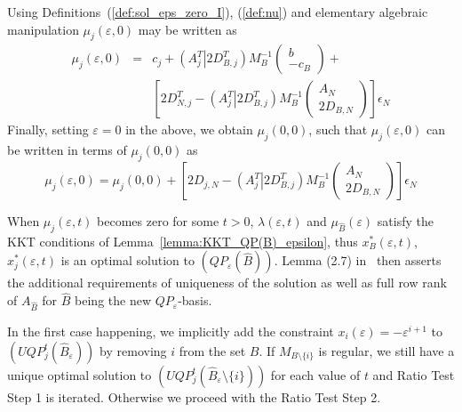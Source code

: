 \documentclass[a4paper]{article}
\newcommand{\xe}[1]{\ensuremath{x_{#1}(\varepsilon)}}
\begin{document}
Using Definitions~(\ref{def:sol_eps_zero_I}), (\ref{def:nu}) and elementary
algebraic manipulation
$\mu_{j}(\varepsilon,0)$ may be written as
\begin{eqnarray*}
  \mu_{j}\left(\varepsilon, 0\right) &=& c_{j} +
  \left(A_{j}^{T} \left|\right. 2D_{B, j}^{T} \right)
  M_{B}^{-1}
  \left(\begin{array}{c}
          b \\
	  \hline
	  -c_{B}
	\end{array}
  \right) + \\
  &&
  \left[2D_{N, j}^{T} -
    \left(A_{j}^{T} \left|\right. 2D_{B, j}^{T} \right)
    M_{B}^{-1}
    \left(\begin{array}{c}
            A_{N} \\
	    \hline
	    2D_{B,N}
	  \end{array}
    \right)
  \right]\epsilon_{N} 
\end{eqnarray*}
Finally, setting $\varepsilon=0$ in the above, we obtain $\mu_{j}(0, 0)$, such
that $\mu_{j}(\varepsilon, 0)$ can be written in terms of $\mu_{j}(0,0)$ as
\begin{equation}
\label{eq:mu_j_eps_zero}
\mu_{j}\left(\varepsilon, 0\right) =
  \mu_{j}\left(0,0\right) +
    \left[
    2D_{j, N} - \left(A_{j}^{T} \left| \right. 2D_{B, j}^{T} \right)
    M_{B}^{-1}
    \left(\begin{array}{c}
            A_{N} \\
	    \hline
	    2D_{B, N}
	  \end{array}
    \right)
  \right]\epsilon_{N}
\end{equation}

When $\mu_{j}\left(\varepsilon, t\right)$ becomes zero for some $t > 0$,
$\lambda\left(\varepsilon, t\right)$ and $\mu_{\hat{B}}(\varepsilon)$ satisfy
the KKT conditions of Lemma~\ref{lemma:KKT_QP(B)_epsilon}, thus
$x_{B}^{*}\left(\varepsilon, t\right)$,
$x_{j}^{*}\left(\varepsilon, t\right)$ is an optimal solution to
$(QP_{\varepsilon}(\hat{B}))$. Lemma (2.7) in~\cite{Sven} then asserts the
additional requirements of uniqueness of the solution as well as full row rank
of $A_{\hat{B}}$ for $\hat{B}$ being the new $QP_{\varepsilon}$-basis.

In the first case happening, we implicitly add the constraint
$\xe{i}=-\varepsilon^{i+1}$
to $(UQP_{j}^{t}(\hat{B}_{\varepsilon}))$ by removing $i$ from the set $B$.
If $M_{B \setminus \{i\}}$ is regular,
we still have a unique optimal solution to
$(UQP_{j}^{t}(\hat{B}_{\varepsilon} \setminus \{i\}))$ for each value of
$t$ and Ratio Test Step 1 is
iterated. Otherwise we proceed with the Ratio Test Step 2.
\end{document}
